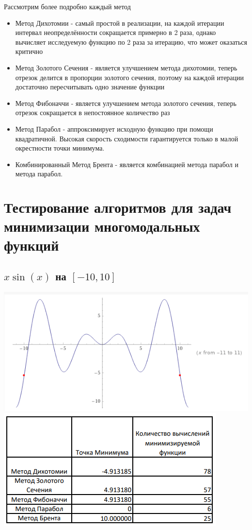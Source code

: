 \documentclass[a4paper,12pt]{article}
\begin{document}
Рассмотрим более подробно каждый метод
\begin{itemize}
\item Метод Дихотомии - самый простой в реализации, на каждой итерации интервал неопределённости сокращается примерно в 2 раза, однако вычисляет исследуемую функцию по 2 раза за итерацию, что может оказаться критично
\item Метод Золотого Сечения - является улучшением метода дихотомии, теперь отрезок делится в пропорции золотого сечения, поэтому на каждой итерации достаточно пересчитывать одно значение функции
\item Метод Фибоначчи - является улучшением метода золотого сечения, теперь отрезок сокращается в непостоянное количество раз
\item Метод Парабол - аппроксимирует исходную функцию при помощи квадратичной. Высокая скорость сходимости гарантируется только в малой окрестности точки минимума.
\item Комбинированный Метод Брента - является комбинацией метода парабол и метода парабол.
\end{itemize}

\clearpage

\section{Тестирование алгоритмов для задач минимизации многомодальных функций}
\subsection{$x\sin(x)$ на $[-10, 10]$}
\includegraphics[width=\linewidth]{xsinx1.PNG}
\includegraphics[width=\linewidth]{xsinx2.PNG}
\end{document}
